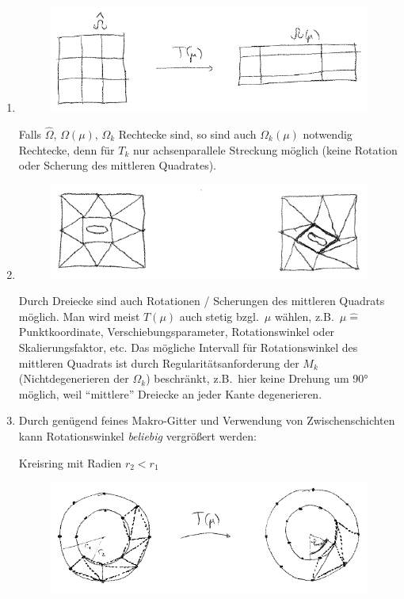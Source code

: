 \begin{enumerate}
	\item
		\begin{figure}[H]
			\centering\small
			\includegraphics[width = 0.75 \textwidth]{Bilder/affine-trafo.png}
		\end{figure}
		Falls $\hat\Omega$, $\Omega(\mu)$, $\Omega_k$ Rechtecke sind, so sind auch $\Omega_k(\mu)$ notwendig Rechtecke, denn für $T_k$ nur achsenparallele Streckung möglich (keine Rotation oder Scherung des mittleren Quadrates).
	\item
		\begin{figure}[H]
			\centering\small
			\includegraphics[width = 0.75 \textwidth]{Bilder/affine-trafo2.png}
		\end{figure}
		Durch Dreiecke sind auch Rotationen / Scherungen des mittleren Quadrats möglich. Man wird meist $T(\mu)$ auch stetig bzgl.\ $\mu$ wählen, z.B.\ $\mu \hat{=}$ Punktkoordinate, Verschiebungsparameter, Rotationswinkel oder Skalierungsfaktor, etc.
		Das mögliche Intervall für Rotationswinkel des mittleren Quadrats ist durch Regularitätsanforderung der $M_k$ (Nichtdegenerieren der $\Omega_k$) beschränkt, z.B.\ hier keine Drehung um 90° möglich, weil ``mittlere'' Dreiecke an jeder Kante degenerieren.
	\item Durch genügend feines Makro-Gitter und Verwendung von Zwischenschichten kann Rotationswinkel \emph{beliebig} vergrößert werden:

		Kreisring mit Radien $r_2 < r_1$

		\begin{figure}[H]
			\centering\small
			\includegraphics[width = 0.75 \textwidth]{Bilder/affine-trafo3.png}
		\end{figure}


\end{enumerate}
